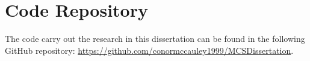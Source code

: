 \chapter{Code Repository} \label{sec:A2}

The code carry out the research in this dissertation can be found in the following GitHub repository: \url{https://github.com/conormccauley1999/MCSDissertation}.
